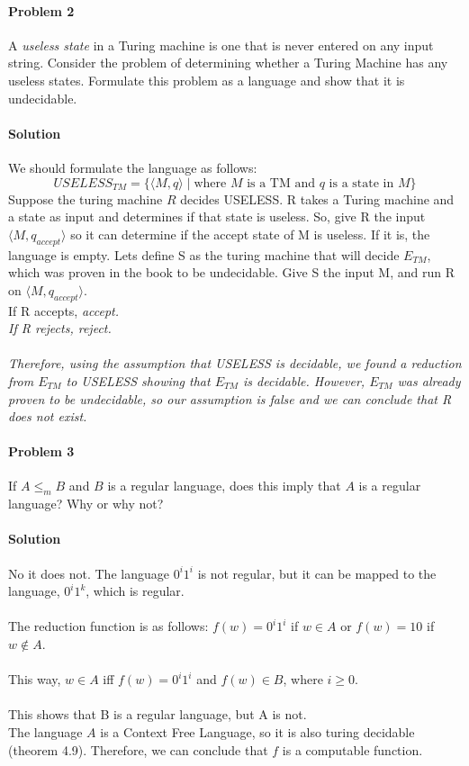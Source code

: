 \documentclass{article}
\begin{document}
\paragraph{Problem 2} A {\em useless state} in a Turing machine
is one that is never entered on any input string.  Consider the 
problem of determining whether a Turing Machine has any useless 
states.  Formulate this problem as a language and show that it 
is undecidable.

\paragraph{Solution} We should formulate the language as follows:
\[USELESS_{TM} = \{ \langle M,q \rangle \;|\; \mbox{where $M$ is a TM and $q$ is a state in $M$} \}\]
\noindent Suppose the turing machine $R$ decides USELESS. R takes a Turing machine and a state as input and determines if that state is useless. So, give R the input $\langle M, q_{accept}\rangle$ so it can determine if the accept state of M is useless. If it is, the language is empty. Lets define S as the turing machine that will decide $E_{TM}$, which was proven in the book to be undecidable. Give S the input M, and run R on $\langle M, q_{accept}\rangle$.
\\If R accepts, \em accept.\em
\\If R rejects, \em reject. \em
\\\\Therefore, using the assumption that USELESS is decidable, we found a reduction from $E_{TM}$ to USELESS showing that $E_{TM}$ is decidable. However, $E_{TM}$ was already proven to be undecidable, so our assumption is false and we can conclude that R does not exist.

\paragraph{Problem 3} If $A \leq_m B$ and $B$ is a regular language,
does this imply that $A$ is a regular language? Why or why not?
\paragraph{Solution} No it does not. The language $0^i1^i$ is not regular, but it can be mapped to the language, $0^i1^k$, which is regular.
\\\\The reduction function is as follows: $f(w) = 0^i1^i$ if $w \in A$ or $f(w) = 10$ if $w \notin A$.
\\\\This way, $w \in A$ iff $f(w) = 0^i1^i$ and $f(w) \in B$, where $i \geq 0$.
\\\\This shows that B is a regular language, but A is not.
\\The language $A$ is a Context Free Language, so it is also turing decidable (theorem 4.9). Therefore, we can conclude that $f$ is a computable function.
\end{document}
